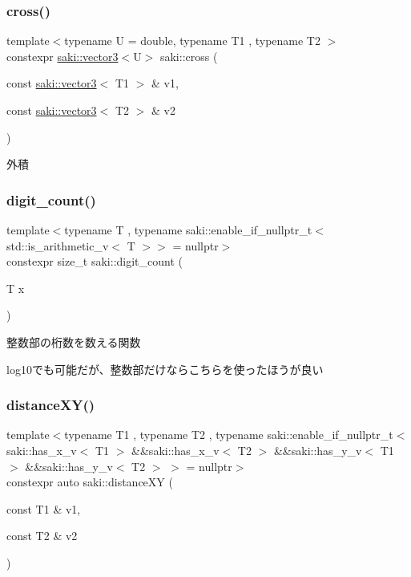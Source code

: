 \subsubsection{\texorpdfstring{cross()}{cross()}\hspace{0.1cm}{\footnotesize\ttfamily [2/2]}}
{\footnotesize\ttfamily template$<$typename U  = double, typename T1 , typename T2 $>$ \\
constexpr \mbox{\hyperlink{classsaki_1_1vector3}{saki\+::vector3}}$<$U$>$ saki\+::cross (\begin{DoxyParamCaption}\item[{const \mbox{\hyperlink{classsaki_1_1vector3}{saki\+::vector3}}$<$ T1 $>$ \&}]{v1,  }\item[{const \mbox{\hyperlink{classsaki_1_1vector3}{saki\+::vector3}}$<$ T2 $>$ \&}]{v2 }\end{DoxyParamCaption})}



外積 

\mbox{\label{namespacesaki_a467dee57b7bbe101146713a82acfe95e}} 
\subsubsection{\texorpdfstring{digit\+\_\+count()}{digit\_count()}}
{\footnotesize\ttfamily template$<$typename T , typename saki\+::enable\+\_\+if\+\_\+nullptr\+\_\+t$<$ std\+::is\+\_\+arithmetic\+\_\+v$<$ T $>$$>$  = nullptr$>$ \\
constexpr size\+\_\+t saki\+::digit\+\_\+count (\begin{DoxyParamCaption}\item[{T}]{x }\end{DoxyParamCaption})}



整数部の桁数を数える関数 

log10でも可能だが、整数部だけならこちらを使ったほうが良い \mbox{\label{namespacesaki_ae6eddecfb6a747238185b21c8ee1cd60}} 
\subsubsection{\texorpdfstring{distance\+X\+Y()}{distanceXY()}}
{\footnotesize\ttfamily template$<$typename T1 , typename T2 , typename saki\+::enable\+\_\+if\+\_\+nullptr\+\_\+t$<$ saki\+::has\+\_\+x\+\_\+v$<$ T1 $>$ \&\&saki\+::has\+\_\+x\+\_\+v$<$ T2 $>$ \&\&saki\+::has\+\_\+y\+\_\+v$<$ T1 $>$ \&\&saki\+::has\+\_\+y\+\_\+v$<$ T2 $>$ $>$  = nullptr$>$ \\
constexpr auto saki\+::distance\+XY (\begin{DoxyParamCaption}\item[{const T1 \&}]{v1,  }\item[{const T2 \&}]{v2 }\end{DoxyParamCaption})}




